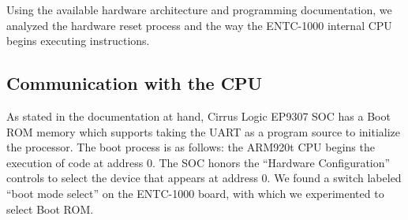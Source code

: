 \documentclass[conference]{IEEEtran}
\newcommand{\nota}[1]{}
\begin{document}

\nota {
Leyendo la documentación obtenida de la arquitectura y programación del hardware,
se analizó el proceso de reinicio del hardware y como la CPU interna
del ENTC-1000 comienza a ejecutar instrucciones.
}

Using the available hardware architecture and programming documentation,
we analyzed the hardware reset process and the way the ENTC-1000
internal CPU begins executing instructions.

\subsection*{Communication with the CPU}

\nota{El SOC Cirrus EP9307 tiene una ROM de arranque\footnote{boot ROM}.
En un reinicio (en inglés reset) del SOC, la CPU (ARM920t) comienza a ejecutar código en la dirección cero.}

As stated in the documentation at hand, Cirrus Logic EP9307 SOC has a Boot ROM memory which supports taking the UART as a program source to initialize the processor. The boot process is as follows: the ARM920t CPU begins the execution of code at address 0. The SOC honors the ``Hardware Configuration'' controls to select the device that appears at address 0. We found a switch labeled ``boot mode select'' on the ENTC-1000 board, with which we experimented to select Boot ROM.

\nota{Por otro lado, el manual del SOC indica que éste utiliza los controles de la ``configuración del hardware'' para seleccionar qué dispositivo aparece en la dirección ``cero''. Al observar la placa ENTC-1000, se identificó un interruptor etiquetado como ``boot mode select''. Por lo que se procedió a experimentar con el mismo, con el objetivo de seleccionar el Boot ROM y así mapearlo a la dirección cero, y por ende, lograr su ejecución. }



\nota{Afortunadamente, en un reinicio, el Cirrus EP9307, en conjunción
con el software de la Boot ROM, operan en un modo llamado 
``download en serie'', que nos permite enviar unos pocos
bytes para ser ejecutados por la CPU. Internamente, en un evento de reinicio,
estos componentes (CPU y Boot ROM) trabajan de la siguiente manera:}
\end{document}
